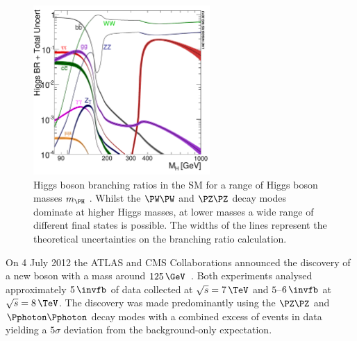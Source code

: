 \begin{figure}[htbp]
   \includegraphics[width=0.6\textwidth]{plots/theory/Higgs_BR.pdf}
\caption[Higgs boson branching ratios in the SM for a range of Higgs boson
masses.]{Higgs boson branching ratios in the SM for a range of Higgs boson
masses $m_{\PH}$ \cite{Heinemeyer:2013tqa}. Whilst the $\PW\PW$ and $\PZ\PZ$
decay modes dominate at higher Higgs masses, at lower masses a wide range of
different final states is possible. The widths of the lines represent the
theoretical uncertainties on the branching ratio calculation.}
\label{fig:SMHiggsBRs}
\end{figure}

On 4 July 2012 the ATLAS and CMS Collaborations announced the discovery of a new
boson with a mass around $125\,\GeV$~\cite{CMSobservation125,ATLASobservation125}. 
Both experiments analysed approximately $5\,\invfb$ of data collected at 
$\sqrt{s}=7\,\TeV$ and $5$--$6\,\invfb$ at $\sqrt{s}=8\,\TeV$. The discovery was
made predominantly using the $\PZ\PZ$ and $\Pphoton\Pphoton$ decay modes with a
combined excess of events in data yielding a $5\sigma$ deviation from the
background-only expectation.

